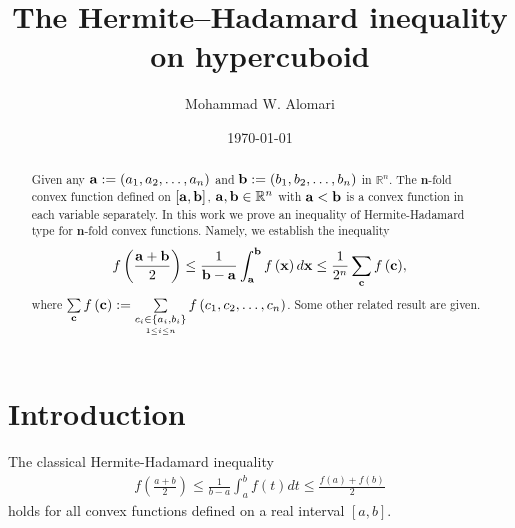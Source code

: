 \documentclass{amsart}
\theoremstyle{plain}
\numberwithin{equation}{section}
\begin{document}
\title[The Hermite--Hadamard inequality on hypercuboid] {The Hermite--Hadamard inequality on hypercuboid}

\author[M.W. Alomari]{Mohammad W. Alomari}

\address{Department of Mathematics,
Faculty of Science and Information Technology, Irbid National
University, 21110 Irbid, Jordan.} 

\date{\today}


\begin{abstract}
Given any ${\bf{a}}: = \left( {a_1 ,a_2 , \ldots ,a_n } \right)$
and ${\bf{b}}: = \left( {b_1 ,b_2 , \ldots ,b_n } \right)$ in
$\mathbb{R}^n$. The $\textbf{n}$-fold convex function defined on
$\left[ {{\bf{a}},{\bf{b}}} \right]$, ${\bf{a}},{\bf{b}} \in
\mathbb{R}^n$ with ${\bf{a}}<{\bf{b}}$ is a convex function in
each variable separately. In this work we prove an inequality of
Hermite-Hadamard type for $\textbf{n}$-fold convex functions.
Namely, we establish the inequality
\begin{align*} f\left( {\frac{{{\bf{a}} + {\bf{b}}}}{2}} \right)
\le \frac{1}{{{\bf{b}} - {\bf{a}}}}\int_{\bf{a}}^{\bf{b}} {f\left(
{\bf{x}} \right)d{\bf{x}}}  \le \frac{1}{{2^n
}}\sum\limits_{\bf{c}} {f\left( {\bf{c}} \right)},
\end{align*}
where $\sum\limits_{\bf{c}} {f\left( {\bf{c}} \right)} : =
\sum\limits_{\mathop {c_i  \in \left\{ {a_i ,b_i }
\right\}}\limits_{1 \le i \le n} } {f\left( {c_1, c_2, \ldots ,c_n
} \right)}$. Some other related result are given.
\end{abstract}
\maketitle

\section{Introduction}

The classical Hermite-Hadamard inequality
\begin{align}
\label{HH}f\left( {\frac{{a + b}}{2}} \right) \le \frac{1}{{b -
a}}\int_a^b {f\left( t \right)dt}  \le \frac{{f\left( a \right) +
f\left( b \right)}}{2}
\end{align}
holds for all convex functions defined on a real interval
$[a,b]$.\\
\end{document}
